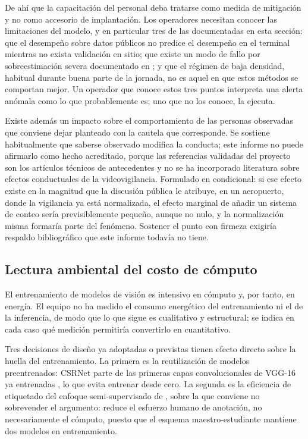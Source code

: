 De ahí que la capacitación del personal deba tratarse como medida de
mitigación y no como accesorio de implantación. Los operadores necesitan
conocer las limitaciones del modelo, y en particular tres de las
documentadas en esta sección: que el desempeño sobre datos públicos no
predice el desempeño en el terminal mientras no exista validación en
sitio; que existe un modo de fallo por sobreestimación severa
documentado en \cite{Lin_2025_CVPR}; y que el régimen de baja densidad,
habitual durante buena parte de la jornada, no es aquel en que estos
métodos se comportan mejor. Un operador que conoce estos tres puntos
interpreta una alerta anómala como lo que probablemente es; uno que no
los conoce, la ejecuta.

Existe además un impacto sobre el comportamiento de las personas
observadas que conviene dejar planteado con la cautela que corresponde.
Se sostiene habitualmente que saberse observado modifica la conducta;
este informe no puede afirmarlo como hecho acreditado, porque las
referencias validadas del proyecto son los artículos técnicos de
antecedentes y no se ha incorporado literatura sobre efectos
conductuales de la videovigilancia. Formulado en condicional: si ese
efecto existe en la magnitud que la discusión pública le atribuye, en un
aeropuerto, donde la vigilancia ya está normalizada, el efecto marginal
de añadir un sistema de conteo sería previsiblemente pequeño, aunque no
nulo, y la normalización misma formaría parte del fenómeno. Sostener el
punto con firmeza exigiría respaldo bibliográfico que este informe
todavía no tiene.

\subsection{Lectura ambiental del costo de cómputo}
\label{sec:impacto-ambiental}

El entrenamiento de modelos de visión es intensivo en cómputo y, por
tanto, en energía. El equipo no ha medido el consumo energético del
entrenamiento ni el de la inferencia, de modo que lo que sigue es
cualitativo y estructural; se indica en cada caso qué medición
permitiría convertirlo en cuantitativo.

Tres decisiones de diseño ya adoptadas o previstas tienen efecto directo
sobre la huella del entrenamiento. La primera es la reutilización de
modelos preentrenados: CSRNet parte de las primeras capas
convolucionales de VGG-16 ya entrenadas \cite{Li_2018_CVPR}, lo que
evita entrenar desde cero. La segunda es la eficiencia de etiquetado del
enfoque semi-supervisado de \cite{Lin_2025_CVPR}, sobre la que conviene
no sobrevender el argumento: reduce el esfuerzo humano de anotación, no
necesariamente el cómputo, puesto que el esquema maestro-estudiante
mantiene dos modelos en entrenamiento.

